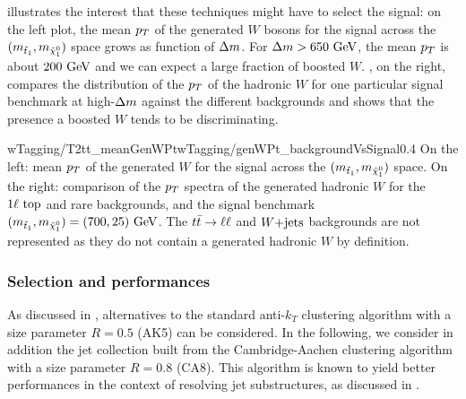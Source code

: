       illustrates the interest that these techniques might have to
     select the signal: on the left plot, the mean $p_T$ of the generated
     $W$ bosons for the signal across the $(m_{\tilde{t}_1}, m_{\tilde{\chi}_1^0})$
     space grows as function of $\Delta m$. For $\Delta m > 650~\text{GeV}$, the
     mean $p_T$ is about $200~\text{GeV}$ and we can expect a large fraction of boosted $W$.
     , on the right, compares the distribution of the $p_T$ of the
     hadronic $W$ for one particular signal benchmark at high-$\Delta m$ against
     the different backgrounds and shows that the presence a boosted $W$ tends to
     be discriminating.

                      {wTagging/T2tt_meanGenWPt}{wTagging/genWPt_backgroundVsSignal}{0.4}
                      {On the left: mean $p_T$ of the generated $W$ for the
                      signal across the $(m_{\tilde{t}_1}, m_{\tilde{\chi}_1^0})$ space.
                      On the right: comparison of the $p_T$ spectra of the generated
                      hadronic $W$ for the $1\ell~\text{top}$ and rare backgrounds, and
                      the signal benchmark $(m_{\tilde{t}_1}, m_{\tilde{\chi}_1^0}) = (700,25) ~\text{GeV}$.
                      The $t\bar{t} \rightarrow \ell \ell$ and $\text{$W$+jets}$ backgrounds are not represented
                      as they do not contain a generated hadronic $W$ by definition.}

    \subsubsection{Selection and performances}

    As discussed in , alternatives to the
    standard anti-$k_T$ clustering algorithm with a size parameter $R = 0.5$
    (AK5) can be considered. In the following, we consider in addition the jet
    collection built from the Cambridge-Aachen clustering algorithm with a size
    parameter $R = 0.8$ (CA8). This algorithm is known to yield better performances
    in the context of resolving jet substructures, as discussed in
    \cite{jetSubstructureSalam, jetClusteringComparison}.


